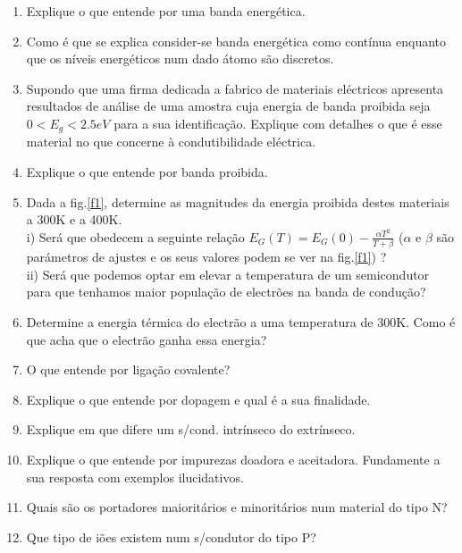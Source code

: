 \documentclass[12pt,a4paper,titlepage]{report}
\begin{document}
\begin{enumerate}
\item Explique o que entende por uma banda energ\'etica.
\item Como \'e que se explica consider-se banda energ\'etica como cont\'inua enquanto que os n\'iveis energ\'eticos num dado \'atomo s\~ao discretos. 
\item Supondo que uma firma dedicada a fabrico de materiais el\'ectricos  apresenta resultados de an\'alise de uma amostra cuja  energia de banda proibida seja $0<E_g<2.5 eV$ para a sua identifica\c c\~ao. Explique com detalhes o que \'e esse material no que concerne \`a condutibilidade el\'ectrica.
\item Explique o que entende por banda proibida.
\item Dada a fig.\ref{f1}, determine as magnitudes da energia proibida destes materiais a 300K e a 400K.\\
 i) Ser\'a que obedecem a seguinte rela\c c\~ao $E_G(T)=E_G(0)-\frac{\alpha T^2}{T+\beta}$ ($\alpha$ e $\beta$ s\~ao par\'ametros de ajustes e os seus valores podem se ver na fig.\ref{f1}) ?\\
 ii) Ser\'a que podemos optar em elevar a temperatura de um semicondutor para  que tenhamos maior popula\c c\~ao de electr\~oes na banda de condu\c c\~ao?

\item Determine a energia t\'ermica do electr\~ao a uma temperatura de 300K. Como \'e que acha que o electr\~ao ganha essa energia? 
\item O que entende por liga\c c\~ao covalente?

\item Explique o que entende por dopagem e qual \'e a sua finalidade.

\item Explique em que difere um s/cond. intr\'inseco do extr\'inseco.
\item Explique o que entende por impurezas doadora e aceitadora. Fundamente a sua resposta com exemplos ilucidativos.
\item Quais s\~ao os portadores maiorit\'arios e minorit\'arios num material do tipo N?
\item Que tipo de i\~oes existem num s/condutor do tipo P?



\end{enumerate}
\end{document}
